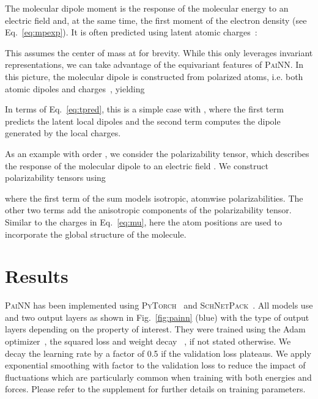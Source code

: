 \documentclass[reprint,
amsmath,amssymb,
 aip,jcp
]{revtex4-2}
\newcommand{\painn}{\textsc{PaiNN}}
\begin{document}
The molecular dipole moment  is the response of the molecular energy to an electric field   and, at the same time, the first moment of the electron density (see Eq.~\ref{eq:mpexp}).
It is often predicted using latent atomic charges~\cite{gastegger2017machine}: 

This assumes the center of mass at  for brevity.
While this only leverages invariant representations, we can take advantage of the equivariant features of \painn{}.
In this picture, the molecular dipole is constructed from polarized atoms, i.e. both atomic dipoles and charges~\cite{veit2020predicting}, yielding

In terms of Eq.~\ref{eq:tpred}, this is a simple case with , where the first term predicts the latent local dipoles and the second term computes the dipole generated by the local charges.

As an example with order , we consider the polarizability tensor, which describes the response of the molecular dipole to an electric field .
We construct polarizability tensors using

where the first term of the sum models isotropic, atomwise polarizabilities.
The other two terms add the anisotropic components of the polarizability tensor.
Similar to the charges in Eq.~\ref{eq:mu}, here the atom positions are used to incorporate the global structure of the molecule.


\section{Results}\label{sec:results}


\painn{} has been implemented using \textsc{PyTorch}~\cite{paszke2019pytorch} and \textsc{SchNetPack}~\cite{schutt2018schnetpack}.
All models use  and two output layers as shown in Fig.~\ref{fig:painn} (blue) with the type of output layers depending on the property of interest.
They were trained using the Adam optimizer~\cite{kingma2014adam}, the squared loss and weight decay ~\cite{loshchilov2017decoupled}, if not stated otherwise.
We decay the learning rate by a factor of 0.5 if the validation loss plateaus. We apply exponential smoothing with factor  to the validation loss to reduce the impact of fluctuations which are particularly common when training with both energies and forces.
Please refer to the supplement for further details on training parameters.
\end{document}
